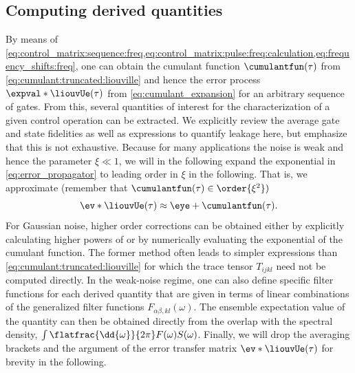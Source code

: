 \subsection{Computing derived quantities}\label{sec:theory:derived_quantities}
By means of \cref{eq:control_matrix:sequence:freq,eq:control_matrix:pulse:freq:calculation,eq:frequency_shifts:freq}, one can obtain the cumulant function $\cumulantfun(\tau)$ from \cref{eq:cumulant:truncated:liouville} and hence the error process $\expval*{\liouvUe(\tau)}$ from \cref{eq:cumulant_expansion} for an arbitrary sequence of gates. From this, several quantities of interest for the characterization of a given control operation can be extracted. We explicitly review the average gate and state fidelities as well as expressions to quantify leakage here, but emphasize that this is not exhaustive. Because for many applications the noise is weak and hence the parameter $\xi\ll 1$, we will in the following expand the exponential in \cref{eq:error_propagator} to leading order in $\xi$ in the following. That is, we approximate (remember that $\cumulantfun(\tau)\in\order{\xi^2})$
\begin{equation}\label{eq:error_transfer_matrix:approx}
\ev*{\liouvUe(\tau)}\approx\eye + \cumulantfun(\tau).
\end{equation}
For Gaussian noise, higher order corrections can be obtained either by explicitly calculating higher powers of \cumulantfun or by numerically evaluating the exponential of the cumulant function. The former method often leads to simpler expressions than \cref{eq:cumulant:truncated:liouville} for which the trace tensor $T_{ijkl}$ need not be computed directly. In the weak-noise regime, one can also define specific filter functions for each derived quantity that are given in terms of linear combinations of the generalized filter functions $F_{\alpha\beta,kl}(\omega)$. The ensemble expectation value of the quantity can then be obtained directly from the overlap with the spectral density, $\int\flatfrac{\dd{\omega}}{2\pi} F(\omega) S(\omega)$. Finally, we will drop the averaging brackets and the argument of the error transfer matrix $\ev*{\liouvUe(\tau)}$ for brevity in the following.

